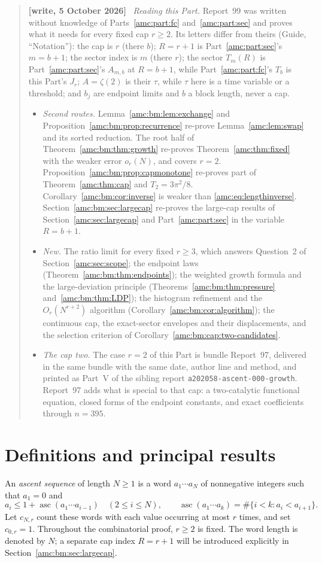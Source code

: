 \documentclass[11pt,letterpaper]{article}
\theoremstyle{remark}\newtheorem{remark}[theorem]{Remark}
\newcommand{\asc}{\operatorname{asc}}
\newenvironment{writenotedated}[1]{\par\smallskip\begin{quote}\small\textbf{[write, #1]}\ }{\end{quote}\smallskip}
\newcommand{\repopath}[1]{\nolinkurl{#1}}
\begin{document}
\begin{writenotedated}{5 October 2026}
\emph{Reading this Part.} Report~99 was written without knowledge of Parts~\ref{amc:part:fc} and~\ref{amc:part:sec} and proves what it needs for every fixed cap $r\ge2$. Its letters differ from theirs (Guide, ``Notation''): the cap is $r$ (there $b$); $R=r+1$ is Part~\ref{amc:part:sec}'s $m=b+1$; the sector index is $m$ (there $r$); the sector $T_m(R)$ is Part~\ref{amc:part:sec}'s $A_{m,b}$ at $R=b+1$, while Part~\ref{amc:part:fc}'s $T_b$ is this Part's $J_r$; $A=\zeta(2)$ is their $\tau$, while $\tau$ here is a time variable or a threshold; and $b_j$ are endpoint limits and $b$ a block length, never a cap.
\begin{itemize}
\item \emph{Second routes.} Lemma~\ref{amc:bm:lem:exchange} and Proposition~\ref{amc:bm:prop:recurrence} re-prove Lemma~\ref{amc:lem:swap} and its sorted reduction. The root half of Theorem~\ref{amc:bm:thm:growth} re-proves Theorem~\ref{amc:thm:fixed} with the weaker error $o_r(N)$, and covers $r=2$. Proposition~\ref{amc:bm:prop:capmonotone} re-proves part of Theorem~\ref{amc:thm:cap} and $T_2=3\pi^2/8$. Corollary~\ref{amc:bm:cor:inverse} is weaker than \eqref{amc:eq:lengthinverse}. Section~\ref{amc:bm:sec:largecap} re-proves the large-cap results of Section~\ref{amc:sec:largecap} and Part~\ref{amc:part:sec} in the variable $R=b+1$.
\item \emph{New.} The ratio limit for every fixed $r\ge3$, which answers Question~2 of Section~\ref{amc:sec:scope}; the endpoint laws (Theorem~\ref{amc:bm:thm:endpoints}); the weighted growth formula and the large-deviation principle (Theorems~\ref{amc:bm:thm:pressure} and~\ref{amc:bm:thm:LDP}); the histogram refinement and the $O_r(N^{r+2})$ algorithm (Corollary~\ref{amc:bm:cor:algorithm}); the continuous cap, the exact-sector envelopes and their displacements, and the selection criterion of Corollary~\ref{amc:bm:cap:two-candidates}.
\item \emph{The cap two.} The case $r=2$ of this Part is bundle Report~97, delivered in the same bundle with the same date, author line and method, and printed as Part~V of the sibling report \repopath{a202058-ascent-000-growth}. Report~97 adds what is special to that cap: a two-catalytic functional equation, closed forms of the endpoint constants, and exact coefficients through $n=395$.
\end{itemize}
\end{writenotedated}

\section{Definitions and principal results}\label{amc:bm:sec:results}
An \emph{ascent sequence} of length $N\ge1$ is a word $a_1\cdots a_N$ of nonnegative integers such that $a_1=0$ and
\[
 a_i\le1+\asc(a_1\cdots a_{i-1})\quad(2\le i\le N),
 \qquad \asc(a_1\cdots a_k)=\#\{i<k:a_i<a_{i+1}\}.
\]
Let $c_{N,r}$ count these words with each value occurring at most $r$ times, and set $c_{0,r}=1$. Throughout the combinatorial proof, $r\ge2$ is fixed. The word length is denoted by $N$; a separate cap index $R=r+1$ will be introduced explicitly in Section~\ref{amc:bm:sec:largecap}.
\end{document}
